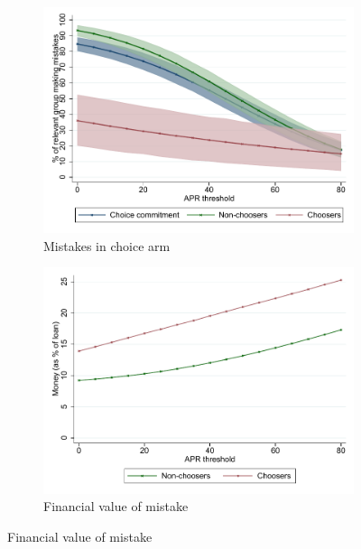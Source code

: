 \documentclass[oneside,11pt]{article}
\begin{document}
\begin{figure}[H]
    \caption{Choice of contracts and treatment effects using TOT \& TUT}
    \label{choose_wrong}
    \begin{center}
        \begin{subfigure}{0.45\textwidth}
        \caption{Mistakes in choice arm}
        \centering
        \includegraphics[width=\textwidth]{Figuras/line_cw_apr_tot_tut.pdf}
        
    \end{subfigure}
        \begin{subfigure}{0.45\textwidth}
        \caption{Financial value of mistake}
        \centering
        \includegraphics[width=\textwidth]{Figuras/money_cw_apr_tot_tut.pdf}
 \end{subfigure}
    \bigskip
        
    \end{center}
    
\end{figure}
\end{document}
